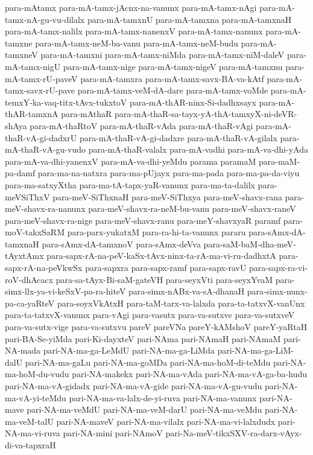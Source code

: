 {para-mAtamx
para-mA-tamx-jAcnx-na-vanunx
para-mA-tamx-nAgi
para-mA-tamx-nA-gu-vu-dilalx
para-mA-tamxnU
para-mA-tamxna
para-mA-tamxnaH
para-mA-tamx-nalilx
para-mA-tamx-nanenxV
para-mA-tamx-nanunx
para-mA-tamxne
para-mA-tamx-neM-ba-vanu
para-mA-tamx-neM-budu
para-mA-tamxneV
para-mA-tamxni
para-mA-tamx-niMda
para-mA-tamx-niM-daleV
para-mA-tamx-nigU
para-mA-tamx-nige
para-mA-tamx-nigeV
para-mA-tamxnu
para-mA-tamx-rU-paveV
para-mA-tamxra
para-mA-tamx-savx-BA-va-kAtf
para-mA-tamx-savx-rU-pave
para-mA-tamx-veM-dA-dare
para-mA-tamx-voMde
para-mA-temxY-ka-vaq-titx-tAvx-tukxtoV
para-mA-thAR-ninx-Si-dadhxsayx
para-mA-thAR-tamxnA
para-mAthaR
para-mA-thaR-sa-tayx-yA-thA-tamxyX-ni-deVR-shAya
para-mA-thaRtoV
para-mA-thaR-vAda
para-mA-thaR-vAgi
para-mA-thaR-vA-gi-dadxrU
para-mA-thaR-vA-gi-dadxre
para-mA-thaR-vA-gilalx
para-mA-thaR-vA-gu-vudo
para-mA-thaR-valalx
para-mA-vadhi
para-mA-va-dhi-yAda
para-mA-va-dhi-yanenxV
para-mA-va-dhi-yeMdu
parama
paramaM
para-maM-pa-damf
para-ma-na-natxra
para-ma-pUjayx
para-ma-pada
para-ma-pa-da-viyu
para-ma-satxyXtha
para-ma-tA-tapx-yaR-vanunx
para-ma-ta-dalilx
para-meVSiThxV
para-meV-SiThxnaH
para-meV-SiThxya
para-meV-shavx-rana
para-meV-shavx-ra-nanunx
para-meV-shavx-ra-neM-bu-vanu
para-meV-shavx-raneV
para-meV-shavx-ra-nige
para-meV-shavx-ranu
para-meY-shavxyaR
paramf
para-moV-takxSaRM
para-parx-yukatxM
para-ra-hi-ta-vanunx
pararu
para-sAmx-dA-tamxnaH
para-sAmx-dA-tamxnoV
para-sAmx-deVva
para-saM-baM-dha-meV-tAyxtAmx
para-sapx-rA-na-peV-kaSx-tAvx-ninx-ta-rA-ma-vi-ru-dadhxtA
para-sapx-rA-na-peVkwSx
para-sapxra
para-sapx-ramf
para-sapx-ravU
para-sapx-ra-vi-roV-dhAcacx
para-sa-tAyx-Bi-saM-gateVH
para-seyxVti
para-seyxYvaM
para-simx-llx-ya-vi-keSxV-pa-ra-hiteV
para-simx-nABx-va-sA-dhanaH
para-simx-nunx-pa-ca-yaRteV
para-soyxVkAtxH
para-taM-tarx-va-lalxda
para-ta-tatxvX-vanUnx
para-ta-tatxvX-vanunx
para-vAgi
para-vasutx
para-va-sutxve
para-va-sutxveV
para-va-sutx-vige
para-va-sutxvu
pareV
pareVNa
pareY-kAMshoV
pareY-yaRtaH
pari-BA-Se-yiMda
pari-Ki-dayxteV
pari-NAma
pari-NAmaH
pari-NAmaM
pari-NA-mada
pari-NA-ma-ga-LeMdU
pari-NA-ma-ga-LiMda
pari-NA-ma-ga-LiM-dalU
pari-NA-ma-gaLu
pari-NA-ma-goMDa
pari-NA-ma-hoM-di-teMdu
pari-NA-ma-hoM-du-vudu
pari-NA-makekx
pari-NA-ma-vAda
pari-NA-ma-vA-ga-ba-hudu
pari-NA-ma-vA-gidadx
pari-NA-ma-vA-gide
pari-NA-ma-vA-gu-vudu
pari-NA-ma-vA-yi-teMdu
pari-NA-ma-va-lalx-de-yi-ruva
pari-NA-ma-vanunx
pari-NA-mave
pari-NA-ma-veMdU
pari-NA-ma-veM-darU
pari-NA-ma-veMdu
pari-NA-ma-veM-talU
pari-NA-maveV
pari-NA-ma-vilalx
pari-NA-ma-vi-lalxdudx
pari-NA-ma-vi-ruva
pari-NA-mini
pari-NAmoV
pari-Na-meV-tikxSXV-ra-darx-vAyx-di-va-tapxraH
}
